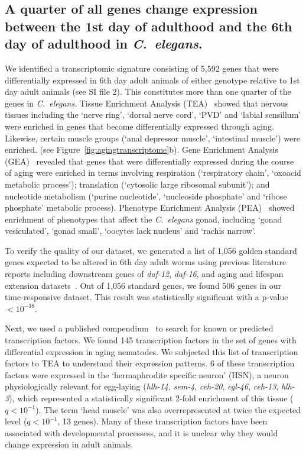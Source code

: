 \documentclass[10pt,letterpaper,twocolumn]{article}
\newcommand{\cel}{\emph{C.~elegans}}
\newcommand{\gene}[1]{\emph{\mbox{#1}}}
\newcommand{\agen}{5,592}
\newcommand{\tfaging}{145}
\newcommand{\goldn}{1,056}
\newcommand{\goldfound}{506}
\newcommand{\goldpval}{$<10^{-38}$}
\begin{document}
\subsection*{A quarter of all genes change expression between the 1st day of
             adulthood and the 6th day of adulthood in \cel{}.}
We identified a transcriptomic signature consisting of \agen{} genes that were
differentially expressed in 6th day adult animals of either genotype relative
to 1st day adult animals (see SI file 2). This constitutes more than one quarter
of the genes in \cel{}. Tissue Enrichment Analysis (TEA)~\cite{Angeles-Albores2016}
showed that nervous tissues including the `nerve ring', `dorsal nerve cord', `PVD'
and `labial sensillum' were enriched in genes that become differentially expressed
through aging. Likewise, certain muscle groups (`anal depressor muscle', `intestinal
muscle') were enriched. (see Figure~\ref{fig:agingtranscriptome}b). Gene
Enrichment Analysis (GEA)~\cite{Angeles-Albores106369} revealed that genes that
were differentially expressed during the course of aging were enriched in terms
involving respiration (`respiratory chain', `oxoacid metabolic process');
translation (`cytosolic large ribosomal subunit'); and nucleotide metabolism
(`purine nucleotide', `nucleoside phosphate' and `ribose phosphate' metabolic
process). Phenotype Enrichment Analysis (PEA)~\cite{Angeles-Albores106369} showed
enrichment of phenotypes that affect the \cel{} gonad, including `gonad vesiculated',
`gonad small', `oocytes lack nucleus' and `rachis narrow'.

To verify the quality of our dataset, we generated a list of \goldn{} golden
standard genes expected to be altered in 6th day adult worms using previous
literature reports including downstream genes of \gene{daf-12}, \gene{daf-16},
and aging and lifespan extension datasets~\cite{Murphy2003,Halaschek-wiener2005,
Lund2002,McCormick2012,Eckley2013}. Out of \goldn{} standard genes, we found
\goldfound{} genes in our time-responsive dataset. This result was statistically
significant with a p-value \goldpval{}.

Next, we used a published compendium~\cite{Reece-Hoyes2005} to search for known
or predicted transcription factors. We found \tfaging{} transcription factors in
the set of genes with differential expression in aging nematodes. We subjected
this list of transcription factors to TEA to understand their expression
patterns. 6 of these transcription factors were expressed in the `hermaphrodite
specific neuron' (HSN), a neuron physiologically relevant for egg-laying
(\gene{hlh-14}, \gene{sem-4}, \gene{ceh-20}, \gene{egl-46}, \gene{ceh-13},
\gene{hlh-3}), which represented a statistically significant 2-fold enrichment of
this tissue ($q<10^{-1}$). The term `head muscle' was also overrepresented at
twice the expected level ($q<10^{-1}$, 13 genes). Many of these transcription
factors have been  associated with developmental processess, and it is unclear
why they would change expression in adult animals.
\end{document}
